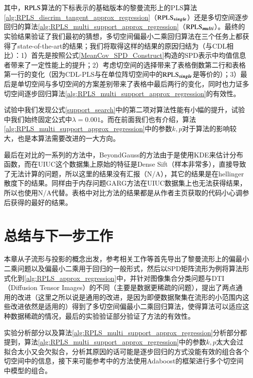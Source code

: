 其中，$\rm RPLS$算法的下标表示的基础版本的黎曼流形上的PLS算法\ref{alg:RPLS_discrim_tangent_approx_regression}（$\rm \bm{RPLS_{single}}$）还是多切空间逐步回归的算法\ref{alg:RPLS_multi_support_approx_regression}（$\rm \bm{RPLS_{multi}}$）。最终的实验结果验证了我们最初的猜想，多切空间偏最小二乘回归算法在三个任务上都获得了state-of-the-art的结果；我们将取得这样的结果的原因归结为（与CDL\cite{Statistics_CDL}相比）：1）首先是按照公式\ref{MeanCov_SPD_Construct}构造的SPD表示中均值信息者带来了一定性能上的提升；2）考虑切空间的选择带来了表格倒数第二行和表格第一行的变化（因为CDL-PLS与在单位阵切空间中的$\rm \bm{RPLS_{single}}$是等价的）；3）最后是单切空间与多切空间的方案差别带来了表格中最后两行的变化，同时也力证多切空间逐步回归算法\ref{alg:RPLS_multi_support_approx_regression}的有效性。

试验中我们发现公式\ref{support_search}中的第二项对算法性能有小幅的提升，试验中我们始终固定公式中$\lambda=0.001$。而在前面我们也有介绍，算法\ref{alg:RPLS_multi_support_approx_regression}中的参数$k,p$对于算法的影响较大，也是本算法需要改进的一大方向。

最后在对比的一系列的方法中，BeyondGauss\cite{Statistics_BeyondGauss}的方法由于是使用KDE来估计分布函数，而在UIUC\cite{Database_UIUC}这个数据集上原始的特征是Dense Sift（样本非常多），直接导致了无法计算的问题，所以这里的结果没有汇报（N/A），其它的结果是在hellinger散度下的结果。同样由于内存问题GARG方法在UIUC数据集上也无法获得结果，所以也使用N/A代替。表格中对比方法的结果都是从作者主页获取的代码小心调参后获得的最好的结果。
\section{总结与下一步工作}
\label{sec:conclusion_futurework}
本章从子流形与投影的概念出发，参考相关工作\cite{PGA,RCCA,AIM_metric,Statistics_CDL}等首先导出了黎曼流形上的偏最小二乘问题以及偏最小二乘用于回归的一般形式，然后以SPD矩阵流形为例将算法形式化到\ref{alg:RPLS_approx_regression}中，并针对图像集合分类问题与DTI（Diffusion Tensor Images）的不同（主要是数据更稀疏的问题），提出了两点通用的改进（这里之所以说是通用的改进，是因为即便数据聚集在流形的小范围内这些改进依然是适用的）得到了多切空间偏最小二乘回归算法，使得算法可以适应这种数据稀疏的情况，最后的实验验证部分验证了方法的有效性。

实验分析部分以及算法\ref{alg:RPLS_multi_support_approx_regression}分析部分都提到，算法\ref{alg:RPLS_multi_support_approx_regression}中的参数$k,p$太大会过拟合太小又会欠拟合，分析其原因的话可能是逐步回归的方式没能有效的组合各个切空间中的信息，接下来可能参考\cite{RegionCov_pedestrain}中的方法使用Adaboost的框架进行多个切空间中模型的组合。